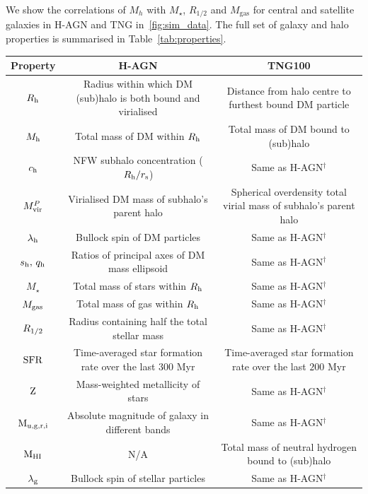 \documentclass[usenatbib,useAMS]{mnras}
\begin{document}
\vspace{3mm}

\noindent We show the correlations of $M_h$ with $M_\star$, $R_{1/2}$ and $M_\text{gas}$ for central and satellite galaxies in H-AGN and TNG in~\cref{fig:sim_data}. The full set of galaxy and halo properties is summarised in Table~\ref{tab:properties}.

\begin{table}
    \centering
    \begin{tabular}{ccc}
        Property & H-AGN & TNG100 \\
        \hline
        \hline
        $R_{\rm h}$ & Radius within which \ac{DM} (sub)halo is both bound and virialised & Distance from halo centre to furthest bound \ac{DM} particle\\
        $M_{\rm h}$ & Total mass of \ac{DM} within $R_{\rm h}$ & Total mass of \ac{DM} bound to (sub)halo\\
        $c_{\rm h}$ & NFW subhalo concentration ($R_{\rm h}/r_{\rm s}$) & Same as H-AGN$^\dagger$\\
        $M_{\rm vir}^P$ & Virialised DM mass of subhalo's parent halo & Spherical overdensity total virial mass of subhalo's parent halo\\
        $\lambda_{\rm h}$ & Bullock spin of \ac{DM} particles & Same as H-AGN$^\dagger$\\
        $s_{\rm h},\,q_{\rm h}$ & Ratios of principal axes of \ac{DM} mass ellipsoid & Same as H-AGN$^\dagger$\\
        \hline
        $M_{\star}$ & Total mass of stars within $R_{\rm h}$ & Same as H-AGN$^\dagger$\\
        $M_{\rm gas}$ & Total mass of gas within $R_{\rm h}$ & Same as H-AGN$^\dagger$\\
        $R_{\rm 1/2}$ & Radius containing half the total stellar mass & Same as H-AGN$^\dagger$\\
        $\rm SFR$ & Time-averaged star formation rate over the last $300$ Myr & Time-averaged star formation rate over the last $200$ Myr\\
        $\rm Z$ & Mass-weighted metallicity of stars & Same as H-AGN$^\dagger$\\
        $\rm M_{u, g, r, i}$ & Absolute magnitude of galaxy in different bands & Same as H-AGN$^\dagger$\\
        $\rm M_{\rm HI}$ & N/A & Total mass of neutral hydrogen bound to (sub)halo\\
        $\lambda_{\rm g}$ & Bullock spin of stellar particles & Same as H-AGN$^\dagger$\\

\end{tabular}
\end{table}
\end{document}
